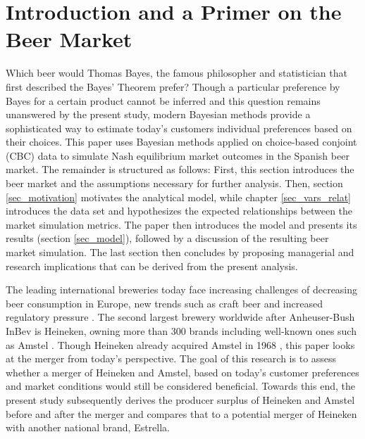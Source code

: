 \documentclass[12pt,a4paper]{article}
\begin{document}
\pagebreak
\pagestyle{plain}
\tableofcontents
\pagebreak
\listoffigures
\listoftables
\renewcommand\lstlistlistingname{List of R Code Chunks}
\lstlistoflistings
\newpage
\setcounter{page}{2}
\setlength{\baselineskip}{1.5\baselineskip}
\pagestyle{plain}


\section{Introduction and a Primer on the Beer Market} \label{sec_intro}
Which beer would Thomas Bayes, the famous philosopher and statistician that first described the Bayes' Theorem \citep{bayesEssaySolvingProblem1763} prefer?
Though a particular preference by Bayes for a certain product cannot be inferred and this question remains unanswered by the present study, modern Bayesian methods provide a sophisticated way to estimate today's customers individual preferences based on their choices.
This paper uses Bayesian methods applied on choice-based conjoint (CBC) data to simulate Nash equilibrium market outcomes in the Spanish beer market.
The remainder is structured as follows: First, this section introduces the beer market and the assumptions necessary for further analysis.
Then, section \ref{sec_motivation} motivates the analytical model, while chapter \ref{sec_vars_relat} introduces the data set and hypothesizes the expected relationships between the market simulation metrics.
The paper then introduces the model and presents its results (section \ref{sec_model}), followed by a discussion of the resulting beer market simulation.
The last section then concludes by proposing managerial and research implications that can be derived from the present analysis.

The leading international breweries today face increasing challenges of decreasing beer consumption in Europe, new trends such as craft beer and increased regulatory pressure \citep{jpmorganWhatTapGlobal2018}.
The second largest brewery worldwide after Anheuser-Bush InBev is Heineken, owning more than 300 brands including well-known ones such as Amstel \citep{heinekenHeinekenAnnualReport2019}.
Though Heineken already acquired Amstel in 1968 \citep[p. 49]{oliverOxfordCompanionBeer2011}, this paper looks at the merger from today's perspective.
The goal of this research is to assess whether a merger of Heineken and Amstel, based on today's customer preferences and market conditions would still be considered beneficial.
Towards this end, the present study subsequently derives the producer surplus of Heineken and Amstel before and after the merger and compares that to a potential merger of Heineken with another national brand, Estrella.
\end{document}
